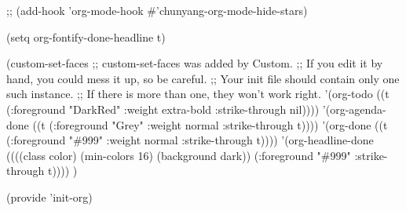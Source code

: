\documentclass[presentation]{beamer}
\begin{document}
;; (add-hook 'org-mode-hook \#'chunyang-org-mode-hide-stars)

(setq org-fontify-done-headline t)

(custom-set-faces
 ;; custom-set-faces was added by Custom.
 ;; If you edit it by hand, you could mess it up, so be careful.
 ;; Your init file should contain only one such instance.
 ;; If there is more than one, they won't work right.
 '(org-todo ((t (:foreground "DarkRed" :weight extra-bold :strike-through nil))))
 '(org-agenda-done ((t (:foreground "Grey" :weight normal :strike-through t))))
 '(org-done ((t (:foreground "\#999" :weight normal :strike-through t))))
 '(org-headline-done ((((class color) (min-colors 16) (background dark)) (:foreground "\#999" :strike-through t))))
 )

(provide 'init-org)
\end{document}
